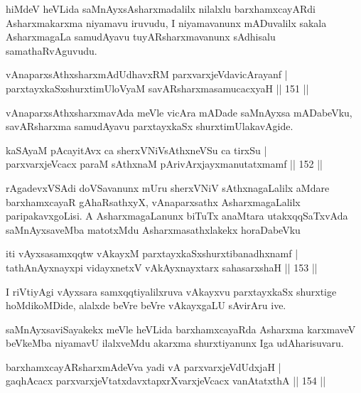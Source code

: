 \begin{artha}
hiMdeV heVLida saMnAyxsAsharxmadalilx nilalxlu barxhamxcayARdi Asharxmakarxma niyamavu iruvudu, I niyamavanunx mADuvalilx sakala AsharxmagaLa samudAyavu tuyARsharxmavanunx sAdhisalu samathaRvAguvudu.
\end{artha}

\begin{shl}
vAnaparxsAthxsharxmAdUdhavxRM parxvarxjeVdavicArayanf |\\
parxtayxkaSxshurxtimUloV\s yaM savARsharxmasamucacxyaH \hfill || 151 ||
\end{shl}

\begin{artha}
vAnaparxsAthxsharxmavAda meVle vicAra mADade saMnAyxsa mADabeVku, savARsharxma samudAyavu parxtayxkaSx shurxtimUlakavAgide.
\end{artha}


\begin{shl}
kaSAyaM pAcayitAvx ca sherxVNiVsAthxneVSu ca tirxSu |\\
parxvarxjeVcacx paraM sAthxnaM pArivArxjayxmanutatxmamf \hfill || 152 ||
\end{shl}

\begin{artha}
rAgadevxVSAdi doVSavanunx mUru sherxVNiV sAthxnagaLalilx aMdare barxhamxcayaR gAhaRsathxyX, vAnaparxsathx AsharxmagaLalilx paripakavxgoLisi. A AsharxmagaLanunx biTuTx anaMtara utakxqqSaTxvAda saMnAyxsaveMba matotxMdu Asharxmasathxlakekx horaDabeVku
\end{artha}

\begin{shl}
iti vAyxsasamxqqtw vAkayxM parxtayxkaSxshurxtibanadhxnamf |\\
tathA\s nAyxnayxpi vidayxnetxV vAkAyxnayxtarx sahasarxshaH \hfill || 153 ||
\end{shl}

\begin{artha}%
I riVtiyAgi vAyxsara samxqqtiyalilxruva vAkayxvu parxtayxkaSx shurxtige hoMdikoMDide, alalxde beVre beVre vAkayxgaLU sAvirAru ive.

saMnAyxsaviSayakekx meVle heVLida barxhamxcayaRda Asharxma karxmaveV beVkeMba niyamavU ilalxveMdu akarxma shurxtiyanunx Iga udAharisuvaru.
\end{artha}

\begin{shl}
barxhamxcayARsharxmAdeVva yadi vA parxvarxjeVdUdxjaH |\\
gaqhAcacx parxvarxjeVtatxdavxtapxrXvarxjeVcacx vanAtatxthA \hfill || 154 ||
\end{shl}

